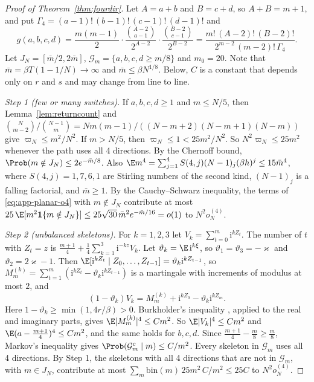 \begin{proof}[Proof of Theorem~\ref{thm:fourdir}]
Let $A=a+b$ and $B=c+d$, so $A+B=m+1$, and put $\Gamma_4=(a-1)!\,(b-1)!\,(c-1)!\,(d-1)!$ and
\[
 g(a,b,c,d)=\frac{m(m-1)}2\cdot\frac{\binom{A-2}{a-1}}{2^{A-2}}\cdot\frac{\binom{B-2}{c-1}}{2^{B-2}}
 =\frac{m!\,(A-2)!\,(B-2)!}{2^{m-2}\,(m-2)!\,\Gamma_4}.
\]
Let $J_N=[\bar m/2,2\bar m]$, $\mathcal G_m=\{a,b,c,d\ge m/8\}$ and $m_0=20$. Note that
$\bar m=\beta T(1-1/N)\to\infty$ and $\bar m\le\beta N^{1/8}$. Below, $C$ is a constant that depends
only on $r$ and $s$ and may change from line to line.

\emph{Step 1 (few or many switches).} If $a,b,c,d\ge1$ and $m\le N/5$, then
Lemma~\ref{lem:returncount} and
$\binom N{m-2}/\binom{N-1}m=Nm(m-1)/((N-m+2)(N-m+1)(N-m))$ give $\varpi_N\le m^2/N^2$. If $m>N/5$,
then $\varpi_N\le1<25m^2/N^2$. So $N^2\varpi_N\le25m^2$ whenever the path uses all 4 directions.
By the Chernoff bound, $\Prob(m\notin J_N)\le2e^{-\bar m/8}$. Also
$\E m^4=\sum_{j=1}^4S(4,j)(N-1)_j(\beta h)^j\le15\bar m^4$, where $S(4,j)=1,7,6,1$ are Stirling
numbers of the second kind, $(N-1)_j$ is a falling factorial, and $\bar m\ge1$. By the
Cauchy--Schwarz inequality, the terms of \eqref{eq:app-planar-o4} with $m\notin J_N$ contribute at
most $25\,\E[m^2\mathbf 1\{m\notin J_N\}]\le25\sqrt{30}\,\bar m^2e^{-\bar m/16}=o(1)$ to
$N^2o^{(4)}_N$.

\emph{Step 2 (unbalanced skeletons).} For $k=1,2,3$ let $V_k=\sum_{t=0}^m\mathrm i^{kZ_t}$. The
number of $t$ with $Z_t=z$ is $\frac{m+1}4+\frac14\sum_{k=1}^3\mathrm i^{-kz}V_k$. Let
$\vartheta_k=\E\,\mathrm i^{k\xi}$, so $\vartheta_1=\vartheta_3=-\varkappa$ and
$\vartheta_2=2\varkappa-1$. Then
$\E[\mathrm i^{kZ_t}\mid Z_0,\dots,Z_{t-1}]=\vartheta_k\mathrm i^{kZ_{t-1}}$, so
$M^{(k)}_m=\sum_{t=1}^m(\mathrm i^{kZ_t}-\vartheta_k\mathrm i^{kZ_{t-1}})$ is a martingale with
increments of modulus at most $2$, and
\[
 (1-\vartheta_k)V_k=M^{(k)}_m+\mathrm i^{kZ_0}-\vartheta_k\mathrm i^{kZ_m}.
\]
Here $1-\vartheta_k\ge\min(1,4r/\beta)>0$. Burkholder's inequality \cite[Ch.~2]{hallheyde1980},
applied to the real and imaginary parts, gives $\E\lvert M^{(k)}_m\rvert^4\le Cm^2$. So
$\E\lvert V_k\rvert^4\le Cm^2$ and $\E(a-\frac{m+1}4)^4\le Cm^2$, and the same holds for $b,c,d$.
Since $\frac{m+1}4-\frac m8\ge\frac m8$, Markov's inequality gives
$\Prob(\mathcal G_m^c\mid m)\le C/m^2$. Every skeleton in $\mathcal G_m$ uses all 4 directions. By
Step 1, the skeletons with all 4 directions that are not in $\mathcal G_m$, with $m\in J_N$,
contribute at most $\sum_m\mathrm{bin}(m)\,25m^2\,C/m^2\le25C$ to $N^2o^{(4)}_N$.


\end{proof}
